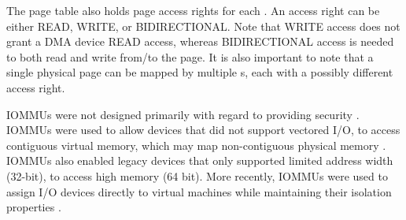 The page table also holds page access rights for each \iova. An access right can be either READ, WRITE, or BIDIRECTIONAL. Note that WRITE access does not grant a DMA device READ access, whereas BIDIRECTIONAL access is needed to both read and write from/to the page. It is also important to note that a single physical page can be mapped by multiple \iova{}s, each with a possibly different access right.

IOMMUs were not designed primarily with regard to providing security \cite{DWT79}. IOMMUs were used to allow devices that did not support vectored I/O, to access contiguous virtual memory, which may map non-contiguous physical memory \cite{Chu96, WMM97}. IOMMUs also enabled legacy devices that only supported limited address width (32-bit), to access high memory (64 bit). More recently, IOMMUs were used to assign I/O devices directly to virtual machines while maintaining their isolation properties \cite{Int16b, AMD16}. 
